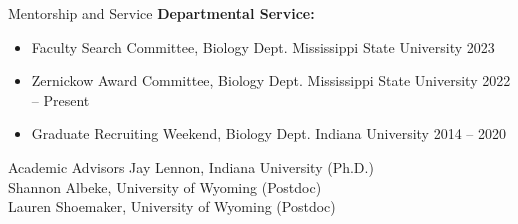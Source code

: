 \documentclass{resume} %
\begin{document}
\begin{rSection}{Mentorship and Service}
{\bf Departmental Service:}
\begin{itemize}
  \item Faculty Search Committee, Biology Dept. Mississippi State University \hfill 2023
  \item Zernickow Award Committee, Biology Dept. Mississippi State University \hfill 2022 -- Present
  \item Graduate Recruiting Weekend, Biology Dept. Indiana University \hfill 2014 -- 2020
\end{itemize}

\end{rSection}
\bigskip

\begin{rSection}{Academic Advisors}
Jay Lennon, Indiana University (Ph.D.) \\
Shannon Albeke, University of Wyoming (Postdoc) \\
Lauren Shoemaker, University of Wyoming (Postdoc) 
\end{rSection}
\bigskip

% 
% 

% 
% 
% 
% 
\end{document}
